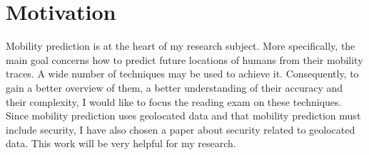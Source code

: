 \newpage
\section{Motivation} \label{motivation}

Mobility prediction is at the heart of my research subject. More specifically, the main goal concerns how to predict future locations of humans from their mobility traces. A wide number of techniques may be used to achieve it. Consequently, to gain a better overview of them, a better understanding of their accuracy and their complexity, I would like to focus the reading exam on these techniques. Since mobility prediction uses geolocated data and that mobility prediction must include security, I have also chosen a paper about security related to geolocated data. This work will be very helpful for my research.